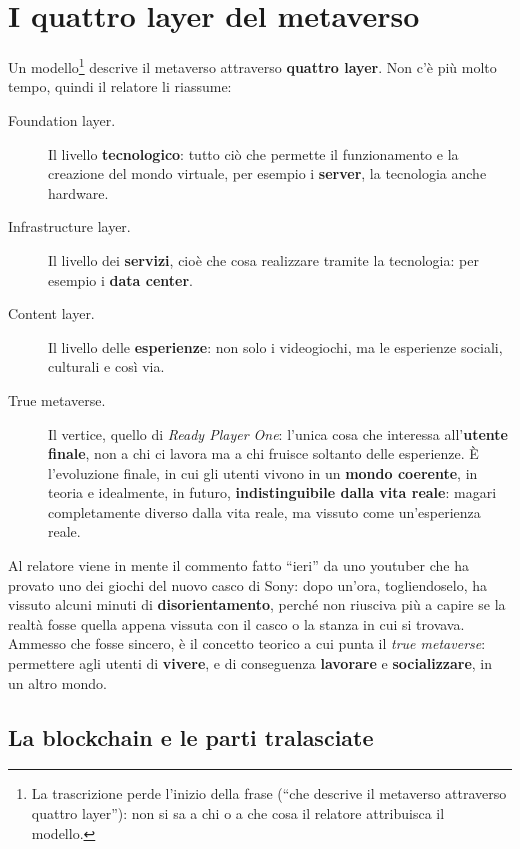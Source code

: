 \section{I quattro layer del metaverso}
\label{z8:sec:layer}

Un modello\footnote{La trascrizione perde l'inizio della frase (``che descrive
il metaverso attraverso quattro layer''): non si sa a chi o a che cosa il
relatore attribuisca il modello.} descrive il metaverso attraverso
\textbf{quattro layer}. Non c'è più molto tempo, quindi il relatore li riassume:
\begin{description}
  \item[Foundation layer.] Il livello \textbf{tecnologico}: tutto ciò che
        permette il funzionamento e la creazione del mondo virtuale, per esempio i
        \textbf{server}, la tecnologia anche hardware.
  \item[Infrastructure layer.] Il livello dei \textbf{servizi}, cioè che cosa
        realizzare tramite la tecnologia: per esempio i \textbf{data center}.
  \item[Content layer.] Il livello delle \textbf{esperienze}: non solo i
        videogiochi, ma le esperienze sociali, culturali e così via.
  \item[True metaverse.] Il vertice, quello di \emph{Ready Player One}: l'unica
        cosa che interessa all'\textbf{utente finale}, non a chi ci lavora ma a
        chi fruisce soltanto delle esperienze. È l'evoluzione finale, in cui gli
        utenti vivono in un \textbf{mondo coerente}, in teoria e idealmente, in
        futuro, \textbf{indistinguibile dalla vita reale}: magari completamente
        diverso dalla vita reale, ma vissuto come un'esperienza reale.
\end{description}

Al relatore viene in mente il commento fatto ``ieri'' da uno youtuber che ha
provato uno dei giochi del nuovo casco di Sony: dopo un'ora, togliendoselo, ha
vissuto alcuni minuti di \textbf{disorientamento}, perché non riusciva più a
capire se la realtà fosse quella appena vissuta con il casco o la stanza in cui
si trovava. Ammesso che fosse sincero, è il concetto teorico a cui punta il
\emph{true metaverse}: permettere agli utenti di \textbf{vivere}, e di
conseguenza \textbf{lavorare} e \textbf{socializzare}, in un altro mondo.

\subsection{La blockchain e le parti tralasciate}

